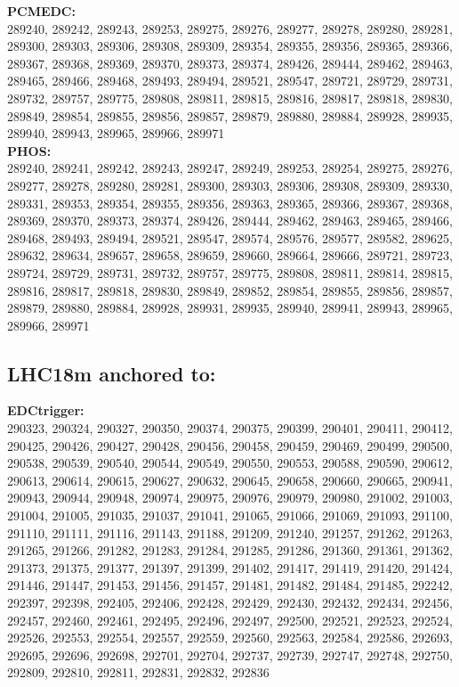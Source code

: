  \textbf{PCMEDC:}\\
 289240, 289242, 289243, 289253, 289275, 289276, 289277, 289278, 289280, 289281, 289300, 289303, 289306, 289308, 289309, 289354, 289355, 289356, 289365, 289366, 289367, 289368, 289369, 289370, 289373, 289374, 289426, 289444, 289462, 289463, 289465, 289466, 289468, 289493, 289494, 289521, 289547, 289721, 289729, 289731, 289732, 289757, 289775, 289808, 289811, 289815, 289816, 289817, 289818, 289830, 289849, 289854, 289855, 289856, 289857, 289879, 289880, 289884, 289928, 289935, 289940, 289943, 289965, 289966, 289971  \\

 \textbf{PHOS:}\\
289240, 289241, 289242, 289243, 289247, 289249, 289253, 289254, 289275, 289276, 289277, 289278, 289280, 289281, 289300, 289303, 289306, 289308, 289309, 289330, 289331, 289353, 289354, 289355, 289356, 289363, 289365, 289366, 289367, 289368, 289369, 289370, 289373, 289374, 289426, 289444, 289462, 289463, 289465, 289466, 289468, 289493, 289494, 289521, 289547, 289574, 289576, 289577, 289582, 289625, 289632, 289634, 289657, 289658, 289659, 289660, 289664, 289666, 289721, 289723, 289724, 289729, 289731, 289732, 289757, 289775, 289808, 289811, 289814, 289815, 289816, 289817, 289818, 289830, 289849, 289852, 289854, 289855, 289856, 289857, 289879, 289880, 289884, 289928, 289931, 289935, 289940, 289941, 289943, 289965, 289966, 289971\\

 \subsection{LHC18m anchored to:  }
\textbf{EDCtrigger:}\\
290323, 290324, 290327, 290350, 290374, 290375, 290399, 290401, 290411, 290412, 290425, 290426, 290427, 290428, 290456, 290458, 290459, 290469, 290499, 290500, 290538, 290539, 290540, 290544, 290549, 290550, 290553, 290588, 290590, 290612, 290613, 290614, 290615, 290627, 290632, 290645, 290658, 290660, 290665, 290941, 290943, 290944, 290948, 290974, 290975, 290976, 290979, 290980, 291002, 291003, 291004, 291005, 291035, 291037, 291041, 291065, 291066, 291069, 291093, 291100, 291110, 291111, 291116, 291143, 291188, 291209, 291240, 291257, 291262, 291263, 291265, 291266, 291282, 291283, 291284, 291285, 291286, 291360, 291361, 291362, 291373, 291375, 291377, 291397, 291399, 291402, 291417, 291419, 291420, 291424, 291446, 291447, 291453, 291456, 291457, 291481, 291482, 291484, 291485, 292242, 292397, 292398, 292405, 292406, 292428, 292429, 292430, 292432, 292434, 292456, 292457, 292460, 292461, 292495, 292496, 292497, 292500, 292521, 292523, 292524, 292526, 292553, 292554, 292557, 292559, 292560, 292563, 292584, 292586, 292693, 292695, 292696, 292698, 292701, 292704, 292737, 292739, 292747, 292748, 292750, 292809, 292810, 292811, 292831, 292832, 292836\\

